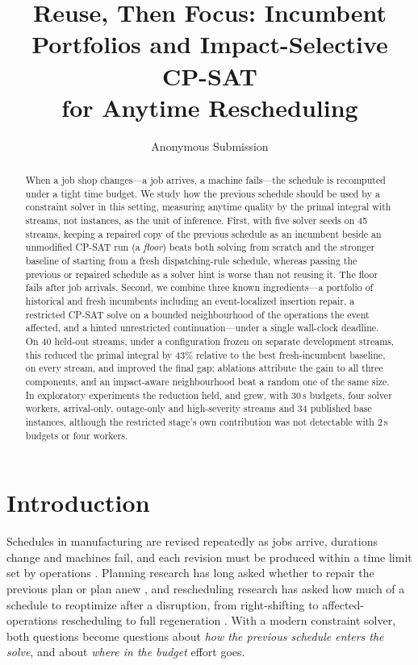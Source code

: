 \documentclass[letterpaper]{article} %
\title{Reuse, Then Focus: Incumbent Portfolios and Impact-Selective CP-SAT\\for Anytime Rescheduling}
\author{
    Anonymous Submission
}
\begin{document}
\maketitle

\begin{abstract}
When a job shop changes---a job arrives, a machine fails---the schedule is recomputed under a tight time budget. We study how the previous schedule should be used by a constraint solver in this setting, measuring anytime quality by the primal integral with streams, not instances, as the unit of inference. First, with five solver seeds on 45 streams, keeping a repaired copy of the previous schedule as an incumbent beside an unmodified CP-SAT run (a \emph{floor}) beats both solving from scratch and the stronger baseline of starting from a fresh dispatching-rule schedule, whereas passing the previous or repaired schedule as a solver hint is worse than not reusing it. The floor fails after job arrivals. Second, we combine three known ingredients---a portfolio of historical and fresh incumbents including an event-localized insertion repair, a restricted CP-SAT solve on a bounded neighbourhood of the operations the event affected, and a hinted unrestricted continuation---under a single wall-clock deadline. On 40 held-out streams, under a configuration frozen on separate development streams, this reduced the primal integral by 43\% relative to the best fresh-incumbent baseline, on every stream, and improved the final gap; ablations attribute the gain to all three components, and an impact-aware neighbourhood beat a random one of the same size. In exploratory experiments the reduction held, and grew, with 30\,s budgets, four solver workers, arrival-only, outage-only and high-severity streams and 34 published base instances, although the restricted stage's own contribution was not detectable with 2\,s budgets or four workers.
\end{abstract}

\section{Introduction}

Schedules in manufacturing are revised repeatedly as jobs arrive, durations change and machines fail, and each revision must be produced within a time limit set by operations \citep{vieira2003,ouelhadj2009}. Planning research has long asked whether to repair the previous plan or plan anew \citep{nebel1995,vanderkrogt2005,fox2006}, and rescheduling research has asked how much of a schedule to reoptimize after a disruption, from right-shifting to affected-operations rescheduling to full regeneration \citep{abumaizar1997,subramaniam2003,sun2026}. With a modern constraint solver, both questions become questions about \emph{how the previous schedule enters the solve}, and about \emph{where in the budget} effort goes.
\end{document}
